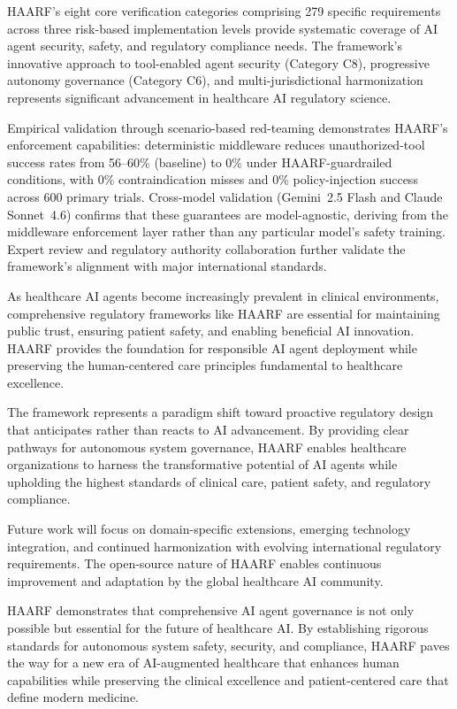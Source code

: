 \documentclass[11pt]{article}
\begin{document}
HAARF's eight core verification categories comprising 279 specific requirements across three risk-based implementation levels provide systematic coverage of AI agent security, safety, and regulatory compliance needs. The framework's innovative approach to tool-enabled agent security (Category C8), progressive autonomy governance (Category C6), and multi-jurisdictional harmonization represents significant advancement in healthcare AI regulatory science.

Empirical validation through scenario-based red-teaming demonstrates HAARF's enforcement capabilities: deterministic middleware reduces unauthorized-tool success rates from 56--60\% (baseline) to 0\% under HAARF-guardrailed conditions, with 0\% contraindication misses and 0\% policy-injection success across 600 primary trials. Cross-model validation (Gemini~2.5 Flash and Claude Sonnet~4.6) confirms that these guarantees are model-agnostic, deriving from the middleware enforcement layer rather than any particular model's safety training. Expert review and regulatory authority collaboration further validate the framework's alignment with major international standards.

As healthcare AI agents become increasingly prevalent in clinical environments, comprehensive regulatory frameworks like HAARF are essential for maintaining public trust, ensuring patient safety, and enabling beneficial AI innovation. HAARF provides the foundation for responsible AI agent deployment while preserving the human-centered care principles fundamental to healthcare excellence.

The framework represents a paradigm shift toward proactive regulatory design that anticipates rather than reacts to AI advancement. By providing clear pathways for autonomous system governance, HAARF enables healthcare organizations to harness the transformative potential of AI agents while upholding the highest standards of clinical care, patient safety, and regulatory compliance.

Future work will focus on domain-specific extensions, emerging technology integration, and continued harmonization with evolving international regulatory requirements. The open-source nature of HAARF enables continuous improvement and adaptation by the global healthcare AI community.

HAARF demonstrates that comprehensive AI agent governance is not only possible but essential for the future of healthcare AI. By establishing rigorous standards for autonomous system safety, security, and compliance, HAARF paves the way for a new era of AI-augmented healthcare that enhances human capabilities while preserving the clinical excellence and patient-centered care that define modern medicine.
\end{document}
